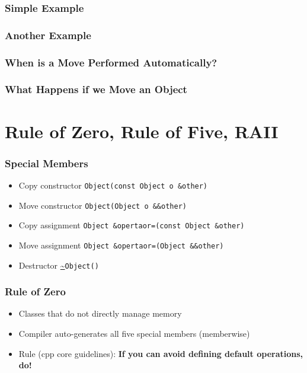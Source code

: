 \documentclass[usenames,dvipsnames,svgnames,table,aspectratio=169]{beamer}
\begin{document}
\begin{frame}
    \frametitle{Simple Example}
    
\end{frame}

\begin{frame}
    \frametitle{Another Example}
    
\end{frame}

\begin{frame}
    \frametitle{When is a Move Performed Automatically?}
    
\end{frame}

\begin{frame}
    \frametitle{What Happens if we Move an Object}
    
\end{frame}

%    
%    

\section{Rule of Zero, Rule of Five, RAII}

\begin{frame}
    \frametitle{Special Members}
    \begin{itemize}
        \item<+-> Copy constructor \lstinline{Object(const Object o &other)}
        \item<+-> Move constructor \lstinline{Object(Object o &&other)}
        \item<+-> Copy assignment \lstinline{Object &opertaor=(const Object &other)}
        \item<+-> Move assignment \lstinline{Object &opertaor=(Object &&other)}
        \item<+-> Destructor \url{~}\lstinline{Object()}
    \end{itemize}
\end{frame}

\begin{frame}
    \frametitle{Rule of Zero}
    \begin{itemize}
        \item<+-> Classes that do not directly manage memory
        \item<+-> Compiler auto-generates all five special members (memberwise)
        \item<+-> Rule (cpp core guidelines): \textbf{If you can avoid defining default operations, do!}
    \end{itemize}
    \only<+->{}
\end{frame}
\end{document}

